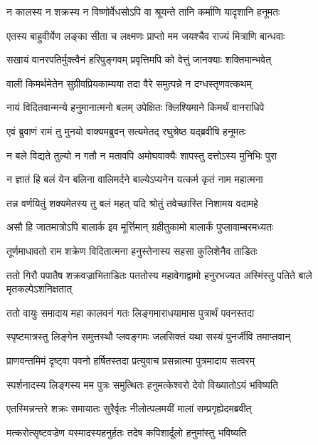 \twolineshloka
{न कालस्य न शक्रस्य न विष्णोर्वेधसोऽपि वा}
{श्रूयन्ते तानि कर्माणि यादृशानि हनूमतः}%


\twolineshloka
{एतस्य बाहुवीर्येण लङ्का सीता च लक्ष्मणः}
{प्राप्तो मम जयश्चैव राज्यं मित्राणि बान्धवाः}%

\twolineshloka
{सखायं वानरपतिर्मुक्त्वैनं हरिपुङ्गवम्}
{प्रवृत्तिमपि को वेत्तुं जानक्याः शक्तिमान्भवेत्}%

\twolineshloka
{वाली किमर्थमेतेन सुग्रीवप्रियकाम्यया}
{तदा वैरे समुत्पन्ने न दग्धस्तृणवत्कथम्}%

\twolineshloka
{नायं विदितवान्मन्ये हनुमानात्मनो बलम्}
{उपेक्षितः क्लिश्यिमाने किमर्थं वानराधिपे}%

\twolineshloka
{एवं ब्रुवाणं रामं तु मुनयो वाक्यमब्रुवन्}
{सत्यमेतद् रघुश्रेष्ठ यद्ब्रवीषि हनूमतः}%

\twolineshloka
{न बले विद्यते तुल्यो न गतौ न मतावपि}
{अमोघवाक्यैः शापस्तु दत्तोऽस्य मुनिभिः पुरा}%

\twolineshloka
{न ज्ञातं हि बलं येन बलिना वालिमर्दने}
{बाल्येऽप्यनेन यत्कर्म कृतं नाम महात्मना}%

\twolineshloka
{तन्न वर्णयितुं शक्यमेतस्य तु बलं महत्}
{यदि श्रोतुं तवेच्छास्ति निशामय वदामहे}%

\twolineshloka
{असौ हि जातमात्रोऽपि बालार्क इव मूर्त्तिमान्}
{ग्रहीतुकामो बालार्कं पुप्लावाम्बरमध्यतः}%

\twolineshloka
{तूर्णमाधावतो राम शक्रेण विदितात्मना}
{हनुस्तेनास्य सहसा कुलिशेनैव ताडितः}%

\threelineshloka
{ततो गिरौ पपातैष शक्रवज्राभिताडितः}
{पततोस्य महावेगाद्वामो हनुरभज्यत}
{अस्मिंस्तु पतिते बाले मृतकल्पेऽशनिक्षतात्}%

\twolineshloka
{ततो वायुः समादाय महा कालवनं गतः}
{लिङ्गमाराधयामास पुत्रार्थं पवनस्तदा}%

\twolineshloka
{स्पृष्टमात्रस्तु लिङ्गेन समुत्तस्थौ प्लवङ्गमः}
{जलसिक्तं यथा सस्यं पुनर्जीवि तमाप्तवान्}%

\twolineshloka
{प्राणवन्तमिमं दृष्ट्वा पवनो हर्षितस्तदा}
{प्रत्युवाच प्रसन्नात्मा पुत्रमादाय सत्वरम्}%

\twolineshloka
{स्पर्शनादस्य लिङ्गस्य मम पुत्रः समुत्थितः}
{हनुमत्केश्वरो देवो विख्यातोऽयं भविष्यति}%

\twolineshloka
{एतस्मिन्नन्तरे शक्रः समायातः सुरैर्वृतः}
{नीलोत्पलमयीं मालां सम्प्रगृह्येदमब्रवीत्}%

\twolineshloka
{मत्करोत्सृष्टवज्रेण यस्मादस्यहनुर्हतः}
{तदेष कपिशार्दूलो हनुमांस्तु भविष्यति}%

